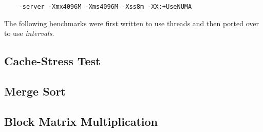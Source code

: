 \begin{verbatim}
    -server -Xmx4096M -Xms4096M -Xss8m -XX:+UseNUMA
\end{verbatim}

The following benchmarks were first written to use threads and then
ported over to use \emph{intervals}.

\subsection*{Cache-Stress Test}


\subsection*{Merge Sort}


\subsection*{Block Matrix Multiplication}




